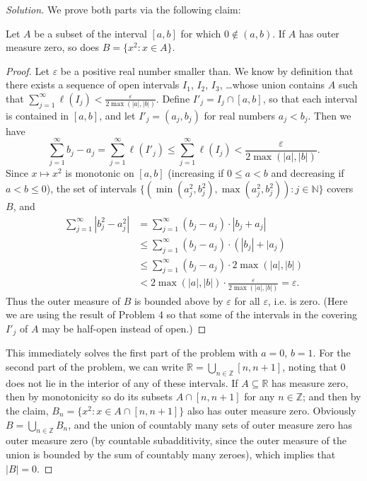 \documentclass[11pt]{article}
\providecommand{\eps}{\varepsilon}
\providecommand{\NN}{\mathbb N}
\providecommand{\RR}{\mathbb R}
\providecommand{\ZZ}{\mathbb Z}
\newenvironment{soln}{\begin{proof}[Solution]}{\end{proof}}
\begin{document}
\begin{soln}
    We prove both parts via the following claim:
    \begin{claim}
        \label{claim:square-meas-zero-interval}
	Let $A$ be a subset of the interval $[a,b]$ for which $0\notin(a,b)$.
	If $A$ has outer measure zero, so does $B = \{x^2 : x\in A\}$.
    \end{claim}
    \begin{proof}
	Let $\eps$ be a positive real number smaller than.
	We know by definition that there exists a sequence of open intervals
	$I_1$, $I_2$, $I_3$, \dots whose union contains $A$ such that
	$\sum_{j=1}^\infty \ell(I_j) < \frac{\eps}{2\max(|a|,|b|)}$.
	Define $I'_j = I_j\cap [a,b]$, so that each interval is contained in $[a,b]$,
	and let $I'_j = (a_j, b_j)$ for real numbers $a_j<b_j$. Then we have
	\begin{equation*}
	    \sum_{j=1}^\infty b_j-a_j =
	    \sum_{j=1}^\infty \ell(I'_j)\le
	    \sum_{j=1}^\infty \ell(I_j) < \frac{\eps}{2\max(|a|,|b|)}.
	\end{equation*}
	Since $x\mapsto x^2$ is monotonic on $[a,b]$ (increasing if $0\le a<b$
	and decreasing if $a<b\le 0$), the set of intervals
	$\{(\min(a_j^2,b_j^2), \max(a_j^2,b_j^2)) : j\in\NN\}$
	covers $B$, and
	\begin{align*}
	    \sum_{j=1}^\infty |b_j^2-a_j^2| &=
	    \sum_{j=1}^\infty (b_j-a_j)\cdot|b_j+a_j|\\
	    &\le \sum_{j=1}^\infty (b_j-a_j)\cdot(|b_j|+|a_j)\\
	    &\le \sum_{j=1}^\infty (b_j-a_j)\cdot2\max(|a|,|b|)\\
	    &< 2\max(|a|,|b|)\cdot \frac{\eps}{2\max(|a|,|b|)} = \eps.
	\end{align*}
	Thus the outer measure of $B$ is bounded above by $\eps$ for all $\eps$,
	i.e. is zero. (Here we are using the result of Problem 4
	so that some of the intervals in the covering $I'_j$ of $A$
	may be half-open instead of open.)
    \end{proof}

    This immediately solves the first part of the problem with $a=0$, $b=1$.
    For the second part of the problem, we can write
    $\RR = \bigcup_{n\in\ZZ}[n,n+1]$, noting that $0$ does not lie in
    the interior of any of these intervals.
    If $A\subseteq\RR$ has measure zero, then by monotonicity
    so do its subsets $A\cap[n,n+1]$ for any $n\in\ZZ$;
    and then by the claim, $B_n = \{x^2 : x\in A\cap[n,n+1]\}$
    also has outer measure zero.
    Obviously $B = \bigcup_{n\in\ZZ} B_n$,
    and the union of countably many sets of outer measure zero
    has outer measure zero (by countable subadditivity,
    since the outer measure of the union is bounded by
    the sum of countably many zeroes),
    which implies that $|B| = 0$.
\end{soln}
\end{document}
